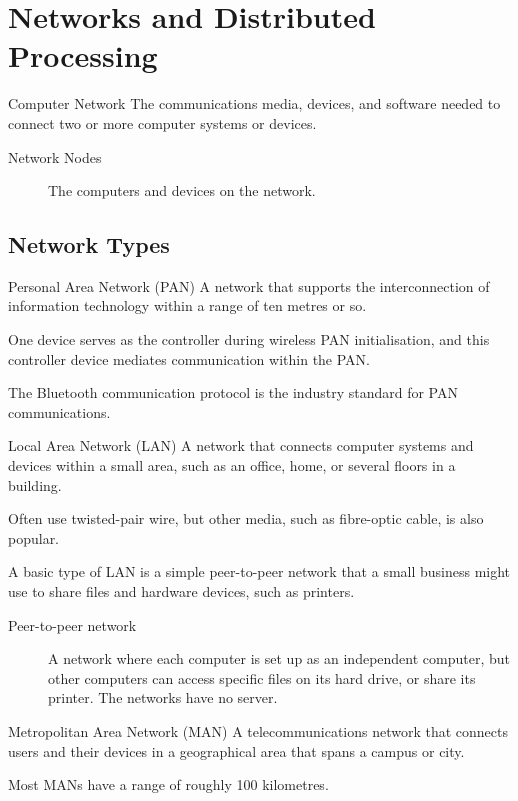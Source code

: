 \documentclass[\main/notes.tex]{subfiles}
\begin{document}
		\section{Networks and Distributed Processing}
			\begin{definition}{Computer Network}
				The communications media, devices, and software needed to connect two or more computer systems or devices.
				\begin{description}
					\item[Network Nodes] The computers and devices on the network.
				\end{description}
			\end{definition}
			\subsection{Network Types}
				\begin{definition}{Personal Area Network (PAN)}
					A network that supports the interconnection of information technology within a range of ten metres or so.

					One device serves as the controller during wireless PAN initialisation, and this controller device mediates communication within the PAN.

					The Bluetooth communication protocol is the industry standard for PAN communications.
				\end{definition}
				\pagebreak
				\begin{definition}{Local Area Network (LAN)}
					A network that connects computer systems and devices within a small area, such as an office, home, or several floors in a building.

					Often use twisted-pair wire, but other media, such as fibre-optic cable, is also popular.

					A basic type of LAN is a simple peer-to-peer network that a small business might use to share files and hardware devices, such as printers.
					\begin{description}
						\item[Peer-to-peer network] A network where each computer is set up as an independent computer, but other computers can access specific files on its hard drive, or share its printer. The networks have no server. 
					\end{description}
				\end{definition}
				\begin{definition}{Metropolitan Area Network (MAN)}
					A telecommunications network that connects users and their devices in a geographical area that spans a campus or city.

					Most MANs have a range of roughly 100 kilometres.
				\end{definition}
\end{document}
